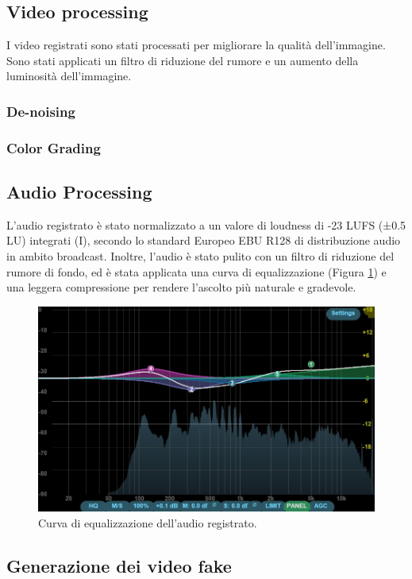 \subsection{Video processing}

I video registrati sono stati processati per migliorare la qualità dell'immagine. Sono stati applicati un filtro di riduzione del rumore e un aumento della luminosità dell'immagine.

\subsubsection{De-noising}

\subsubsection{Color Grading}

\subsection{Audio Processing}

L'audio registrato è stato normalizzato a un valore di loudness di -23 LUFS (±0.5 LU) integrati (I), secondo lo standard Europeo EBU R128 di distribuzione audio in ambito broadcast. Inoltre, l'audio è stato pulito con un filtro di riduzione del rumore di fondo, ed è stata applicata una curva di equalizzazione (Figura \ref{fig:eq_curve}) e una leggera compressione per rendere l'ascolto più naturale e gradevole.


\begin{figure}[t]
    \centering
    \includegraphics[width=0.62\linewidth]{images/eq_curve}
    \caption{Curva di equalizzazione dell'audio registrato.}
    \label{fig:eq_curve}
\end{figure}

\subsection{Generazione dei video fake}

\clearpage